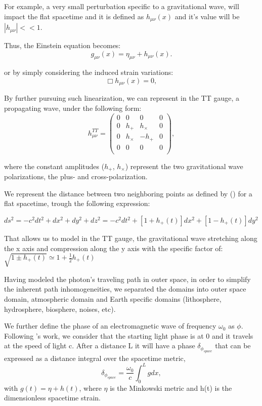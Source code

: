\documentclass[twoside,11pt]{article}
\begin{document}
For example, a very small perturbation specific to a gravitational wave, will impact the flat spacetime and it is defined as $h_{\mu\nu}(x)$ and it's value will be $|h_{\mu\nu}| << 1$. 

Thus, the Einstein equation becomes:
\begin{equation}  \label{small_disturbance}
g_{\mu\nu}(x) = \eta_{\mu\nu} + h_{\mu\nu}(x) . 
\end{equation} 

or by simply considering the induced strain variations:
\begin{equation}  \label{Einstein_Alembertian}
\Box h_{\mu\nu}(x)=0,
\end{equation}

By further pursuing such linearization, we can represent in the TT gauge, a propagating wave, under the following form: 
\begin{equation} \label{TT gauge}
h_{\mu\nu}^{TT}= 
\begin{pmatrix} 
0 & 0 & 0 & 0 \\
0 & h_{+} & h_{\times} & 0 \\
0 & h_{\times} & -h_{+} & 0 \\
0 & 0 & 0 & 0 \\
\end{pmatrix} ,
\end{equation}

where the constant amplitudes ($h_+$, $h_\times$) represent the two gravitational wave polarizations, the plus- and cross-polarization.

We represent the distance between two neighboring points as defined by (\cite{Behnke}) for a flat spacetime, trough the following expression:

\begin{center}
$ds^2 = -c^2dt^2+dx^2+dy^2+dz^2=-c^2dt^2+[1+h_+(t)]dx^2+[1-h_+(t)]dy^2 $
\end{center}

That allows us to model in the TT gauge, the gravitational wave stretching along the x axis and compression along the y axis with the specific factor of: $\sqrt{1\pm h_+(t)}\simeq 1+\frac{1}{2}h_+(t)$

Having modeled the photon's traveling path in outer space, in order to simplify the inherent path inhomogeneities, we separated the domains into outer space domain, atmospheric domain and Earth specific domains (lithosphere, hydrosphere, biosphere, noises, etc). 

We further define the phase of an electromagnetic wave of frequency $\omega_0$ as $\phi$. Following \cite{Driggers}'s work, we consider that the starting light phase is at 0 and it travels at the speed of light c. After a distance L it will have a phase $\delta_{\phi_{space}}$ that can be expressed as a distance integral over the spacetime metric,
\begin{equation} \label{space domain}
\delta_{\phi_{space}} = \frac{\omega_0}{c} \int_{0}^{L}g dx, 
\end{equation}
with $g(t)=\eta+h(t)$, where $\eta$ is the Minkowski metric and h(t) is the dimensionless spacetime strain.
\end{document}
